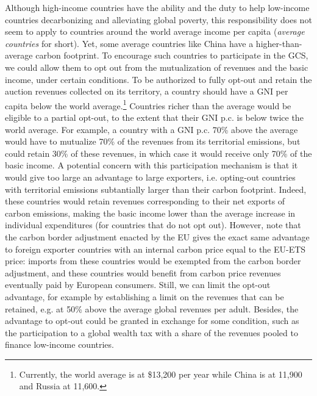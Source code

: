 \documentclass[12pt,english]{article}
\begin{document}
Although high-income countries have the ability and the duty to help low-income countries decarbonizing and alleviating global poverty, this responsibility does not seem to apply to countries around the world average income per capita (\textit{average countries} for short). Yet, some average countries like China have a higher-than-average carbon footprint. To encourage such countries to participate in the GCS, we could allow them to opt out from the mutualization of revenues and the basic income, under certain conditions. To be authorized to fully opt-out and retain the auction revenues collected on its territory, a country should have a GNI per capita below the world average.\footnote{Currently, the world average is at \$13,200 per year while China is at 11,900 and Russia at 11,600.} Countries richer than the average would be eligible to a partial opt-out, to the extent that their GNI p.c. is below twice the world average. For example, a country with a GNI p.c. 70\% above the average would have to mutualize 70\% of the revenues from its territorial emissions, but could retain 30\% of these revenues, in which case it would receive only 70\% of the basic income. 
A potential concern with this participation mechanism is that it would give too large an advantage to large exporters, i.e. opting-out countries with territorial emissions subtantially larger than their carbon footprint. Indeed, these countries would retain revenues corresponding to their net exports of carbon emissions, making the basic income lower than the average increase in individual expenditures (for countries that do not opt out). However, note that the carbon border adjustment enacted by the EU gives the exact same advantage to foreign exporter countries with an internal carbon price equal to the EU-ETS price: imports from these countries would be exempted from the carbon border adjustment, and these countries would benefit from carbon price revenues eventually paid by European consumers. Still, we can limit the opt-out advantage, for example by establishing a limit on the revenues that can be retained, e.g. at 50\% above the average global revenues per adult. 
Besides, the advantage to opt-out could be granted in exchange for some condition, such as the participation to a global wealth tax with a share of the revenues pooled to finance low-income countries. %
\end{document}
